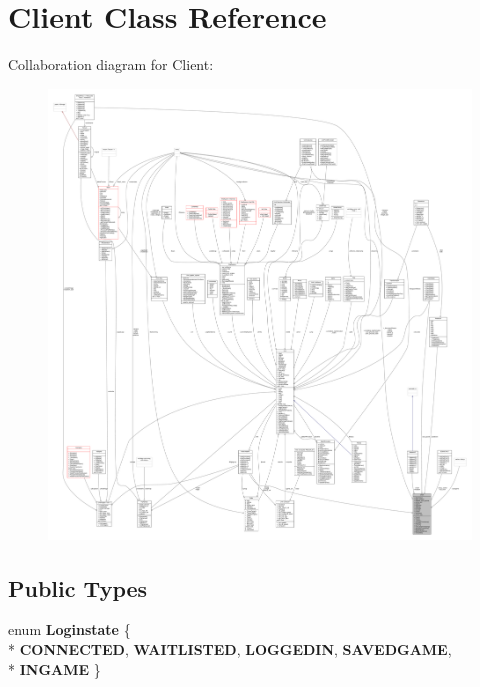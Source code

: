 \hypertarget{classClient}{}\section{Client Class Reference}
\label{classClient}


Collaboration diagram for Client\+:
\nopagebreak
\begin{figure}[H]
\begin{center}
\leavevmode
\includegraphics[width=350pt]{da/dc1/classClient__coll__graph}
\end{center}
\end{figure}
\subsection*{Public Types}
\begin{DoxyCompactItemize}
\item 
enum {\bfseries Loginstate} \{ \\*
{\bfseries C\+O\+N\+N\+E\+C\+T\+ED}, 
{\bfseries W\+A\+I\+T\+L\+I\+S\+T\+ED}, 
{\bfseries L\+O\+G\+G\+E\+D\+IN}, 
{\bfseries S\+A\+V\+E\+D\+G\+A\+ME}, 
\\*
{\bfseries I\+N\+G\+A\+ME}
 \}\hypertarget{classClient_a8876aed2bb4cc003b3fb8e5f8dd4e8a0}{}\label{classClient_a8876aed2bb4cc003b3fb8e5f8dd4e8a0}

\end{DoxyCompactItemize}
